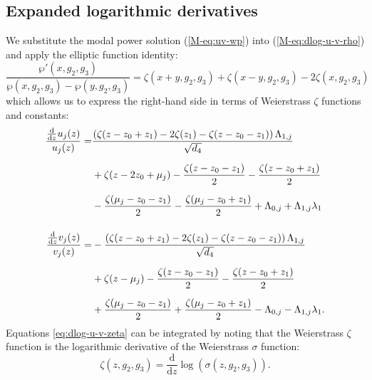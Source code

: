 \documentclass[11pt,a4paper]{article}
\newcommand{\externaleqref}[1]{\textup{(\ref*{#1})}}
\begin{document}
\subsection{Expanded logarithmic derivatives}
We substitute the modal power solution \externaleqref{M-eq:uv-wp} into \externaleqref{M-eq:dlog-u-v-rho} and apply the elliptic function identity:
\begin{equation}
\frac{\wp'{\left(x,g_{2},g_{3} \right)}}{\wp{\left(x,g_{2},g_{3} \right)} - \wp{\left(y,g_{2},g_{3} \right)}} = \zeta{\left(x + y,g_{2},g_{3} \right)} + \zeta{\left(x - y,g_{2},g_{3} \right)} - 2 \zeta{\left(x,g_{2},g_{3} \right)}
\end{equation}
which allows us to express the right-hand side in terms of Weierstrass $\zeta$ functions and constants:
\begin{align}
\frac{\frac{\mathrm{d}}{\mathrm{d}z} u_j{\left(z\right)}}{u_j{\left(z\right)}} =& \frac{\left(\zeta{\left(z - z_{0} + z_{1} \right)} - 2 \zeta{\left(z_{1} \right)} - \zeta{\left(z - z_{0} - z_{1} \right)}\right) {\Lambda}_{1,j}}{\sqrt{{d}_{4}}} \nonumber \\[6pt]
& + \zeta{\left(z - 2 z_{0} + {\mu}_{j} \right)} - \frac{\zeta{\left(z - z_{0} - z_{1} \right)}}{2} - \frac{\zeta{\left(z - z_{0} + z_{1} \right)}}{2} \nonumber \\[6pt]
& - \frac{\zeta{\left({\mu}_{j} - z_{0} - z_{1}\right)}}{2} - \frac{\zeta{\left({\mu}_{j} - z_{0} + z_{1}\right)}}{2} + {\Lambda}_{0,j} + {\Lambda}_{1,j} {\lambda}_{1} \notag \\[12pt]
\frac{\frac{\mathrm{d}}{\mathrm{d}z} v_j{\left(z\right)}}{v_j{\left(z\right)}} =& - \frac{\left(\zeta{\left(z - z_{0} + z_{1} \right)} - 2 \zeta{\left(z_{1} \right)} - \zeta{\left(z - z_{0} - z_{1} \right)}\right) {\Lambda}_{1,j}}{\sqrt{{d}_{4}}} \nonumber \\[6pt]
& + \zeta{\left(z - {\mu}_{j} \right)} - \frac{\zeta{\left(z - z_{0} - z_{1} \right)}}{2} - \frac{\zeta{\left(z - z_{0} + z_{1} \right)}}{2} \nonumber \\[6pt]
& + \frac{\zeta{\left({\mu}_{j} - z_{0} - z_{1}\right)}}{2} + \frac{\zeta{\left({\mu}_{j} - z_{0} + z_{1} \right)}}{2} - {\Lambda}_{0,j} - {\Lambda}_{1,j} {\lambda}_{1}. \label{eq:dlog-u-v-zeta}
\end{align}
Equations \eqref{eq:dlog-u-v-zeta} can be integrated by noting that the Weierstrass $\zeta$ function is the logarithmic derivative of the Weierstrass $\sigma$ function:
\begin{equation}
\label{eq:zeta-dlog_sigma}
\zeta\left(z, g_2, g_3\right)=\frac{\mathrm{d}}{\mathrm{d}z} \log{\left(\sigma\left(z, g_2, g_3\right)\right)}.
\end{equation}
\end{document}
